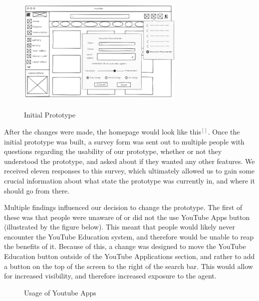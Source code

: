 \documentclass[letterpaper]{article} %
\begin{document}
\begin{figure}[h]     
	\centering
    \includegraphics[width=8cm, height=6cm]{prototype0.PNG}
    \caption{Initial Prototype}
    \label{fig:prototype0}
\end{figure}

After the changes were made, the homepage would look like this$^[]$. Once the initial prototype was built, a survey form was sent out to multiple people with questions regarding the usability of our prototype, whether or not they understood the prototype, and asked about if they wanted any other features. We received eleven responses to this survey, which ultimately allowed us to gain some crucial information about what state the prototype was currently in, and where it should go from there.
 
Multiple findings influenced our decision to change the prototype. The first of these was that people were unaware of or did not the use YouTube Apps button (illustrated by the figure below). This meant that people would likely never encounter the YouTube Education system, and therefore would be unable to reap the benefits of it. Because of this, a change was designed to move the YouTube Education button outside of the YouTube Applications section, and rather to add a button on the top of the screen to the right of the search bar. This would allow for increased visibility, and therefore increased exposure to the agent. 

\begin{figure}[h]
        \caption{Usage of Youtube Apps}
        \label{fig:AppsPie}
        \center
    \end{figure}
\end{document}
